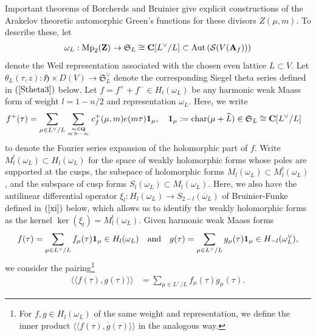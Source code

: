 \documentclass{amsart}
\theoremstyle{definition}
\theoremstyle{definition}
\theoremstyle{definition}
\begin{document}
Important theorems of Borcherds \cite{Bo} and Bruinier \cite{Br} give explicit constructions
of the Arakelov theoretic automorphic Green's functions for these divisors $Z(\mu, m)$. To describe these, let 
\begin{align*} \omega_L: \operatorname{Mp}_2({\bf{Z}}) \rightarrow \mathfrak{S}_L \cong {\bf{C}}[L^{\vee}/L] \subset \operatorname{Aut} \left( \mathcal{S}(V({\bf{A}}_f) ) \right) \end{align*} 
denote the Weil representation associated with the chosen even lattice $L \subset V$. Let 
$\theta_L(\tau, z): \mathfrak{H} \times D(V) \rightarrow \mathfrak{S}_L^{\vee}$
denote the corresponding Siegel theta series defined in $(\ref{Stheta3})$ below. 
Let $f = f^+ + f^-\in H_{l}(\omega_L)$ be any harmonic weak Maass form of weight 
$l =1 - n/2$ and representation $\omega_L$. Here, we write 
\begin{align*} f^+(\tau) &= \sum\limits_{\mu \in  L^{\vee}/L} \sum\limits_{m \in {\bf{Q}} \atop m \gg - \infty} c_f^+(\mu, m) e(m \tau) {\bf{1}}_{\mu},
\quad {\bf{1}}_{\mu}:= \operatorname{char}(\mu + \widehat{L}) \in \mathfrak{S}_L \cong {\bf{C}}[L^{\vee}/L]\end{align*}
to denote the Fourier series expansion of the holomorphic part of $f$.
Write $M_l^!(\omega_L) \subset H_l(\omega_L)$ for the space of weakly holomorphic forms whose poles are supported at the cusps,
the subspace of holomorphic forms $M_l(\omega_L) \subset M_l^!(\omega_L)$, and the subspace of cusp forms
$S_l(\omega_L) \subset M_l (\omega_L)$. Here, we also have the antilinear differential
operator $\xi_l: H_l(\omega_L) \rightarrow S_{2-l}(\overline{\omega}_L)$ of Bruinier-Funke \cite{BF} defined in $(\ref{xi})$ below, 
which allows us to identify the weakly holomorphic forms as the kernel $\ker(\xi_l) = M_l^!(\omega_L)$. Given harmonic weak Maass forms 
\begin{align*} f(\tau) = \sum\limits_{\mu \in L^{\vee}/L} f_{\mu}(\tau) {\bf{1}}_{\mu} \in H_l(\omega_L) \quad\text{and}\quad
g(\tau) = \sum\limits_{\mu \in L^{\vee}/L} g_{\mu}(\tau) {\bf{1}}_{\mu} \in H_{-l}(\omega_L^{\vee}), \end{align*}
we consider the pairing\footnote{For $f, g \in H_l(\omega_L)$ of the same weight and representation, 
we define the inner product $\langle \langle f(\tau), \overline{g}(\tau) \rangle \rangle$ in the analogous way.} 
\begin{align*} \langle \langle f(\tau), g(\tau) \rangle \rangle &= \sum\limits_{\mu \in L^{\vee}/L} f_{\mu}(\tau) g_{\mu}(\tau). \end{align*}
\end{document}
